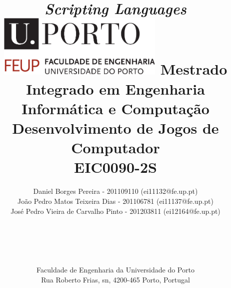 \documentclass[12pt]{article}
\begin{document}
\setlength{\textwidth}{16cm}
\setlength{\textheight}{22cm}
\title{\Huge\textbf{\textit{Scripting Languages}}\linebreak
\linebreak\linebreak\linebreak
\includegraphics[width=8cm]{feup.pdf}\linebreak \linebreak
\large{Mestrado Integrado em Engenharia Informática e Computação} \linebreak
\large{Desenvolvimento de Jogos de Computador \\ EIC0090-2S}\linebreak
}




\author{Daniel Borges Pereira - 201109110 (ei11132@fe.up.pt)\\
João Pedro Matos Teixeira Dias - 201106781 (ei11137@fe.up.pt)\\
José Pedro Vieira de Carvalho Pinto - 201203811 (ei12164@fe.up.pt)\\
\\\\\\\\\\ Faculdade de Engenharia da Universidade do Porto \\ Rua Roberto Frias, s\/n, 4200-465 Porto, Portugal
 \vspace{1cm}}
\maketitle
\thispagestyle{empty}


\newpage

\tableofcontents

\end{document}
